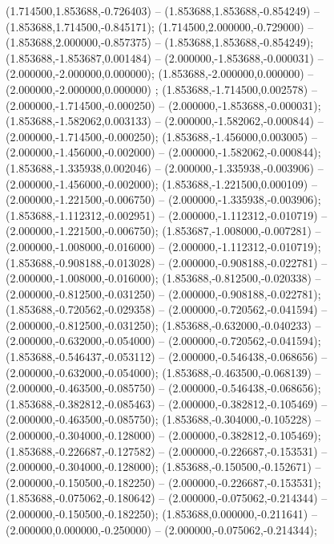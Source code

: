  (1.714500,1.853688,-0.726403) -- (1.853688,1.853688,-0.854249) -- (1.853688,1.714500,-0.845171);
 (1.714500,2.000000,-0.729000) -- (1.853688,2.000000,-0.857375) -- (1.853688,1.853688,-0.854249);
 (1.853688,-1.853687,0.001484) -- (2.000000,-1.853688,-0.000031) -- (2.000000,-2.000000,0.000000);
 (1.853688,-2.000000,0.000000) -- (2.000000,-2.000000,0.000000) ;
 (1.853688,-1.714500,0.002578) -- (2.000000,-1.714500,-0.000250) -- (2.000000,-1.853688,-0.000031);
 (1.853688,-1.582062,0.003133) -- (2.000000,-1.582062,-0.000844) -- (2.000000,-1.714500,-0.000250);
 (1.853688,-1.456000,0.003005) -- (2.000000,-1.456000,-0.002000) -- (2.000000,-1.582062,-0.000844);
 (1.853688,-1.335938,0.002046) -- (2.000000,-1.335938,-0.003906) -- (2.000000,-1.456000,-0.002000);
 (1.853688,-1.221500,0.000109) -- (2.000000,-1.221500,-0.006750) -- (2.000000,-1.335938,-0.003906);
 (1.853688,-1.112312,-0.002951) -- (2.000000,-1.112312,-0.010719) -- (2.000000,-1.221500,-0.006750);
 (1.853687,-1.008000,-0.007281) -- (2.000000,-1.008000,-0.016000) -- (2.000000,-1.112312,-0.010719);
 (1.853688,-0.908188,-0.013028) -- (2.000000,-0.908188,-0.022781) -- (2.000000,-1.008000,-0.016000);
 (1.853688,-0.812500,-0.020338) -- (2.000000,-0.812500,-0.031250) -- (2.000000,-0.908188,-0.022781);
 (1.853688,-0.720562,-0.029358) -- (2.000000,-0.720562,-0.041594) -- (2.000000,-0.812500,-0.031250);
 (1.853688,-0.632000,-0.040233) -- (2.000000,-0.632000,-0.054000) -- (2.000000,-0.720562,-0.041594);
 (1.853688,-0.546437,-0.053112) -- (2.000000,-0.546438,-0.068656) -- (2.000000,-0.632000,-0.054000);
 (1.853688,-0.463500,-0.068139) -- (2.000000,-0.463500,-0.085750) -- (2.000000,-0.546438,-0.068656);
 (1.853688,-0.382812,-0.085463) -- (2.000000,-0.382812,-0.105469) -- (2.000000,-0.463500,-0.085750);
 (1.853688,-0.304000,-0.105228) -- (2.000000,-0.304000,-0.128000) -- (2.000000,-0.382812,-0.105469);
 (1.853688,-0.226687,-0.127582) -- (2.000000,-0.226687,-0.153531) -- (2.000000,-0.304000,-0.128000);
 (1.853688,-0.150500,-0.152671) -- (2.000000,-0.150500,-0.182250) -- (2.000000,-0.226687,-0.153531);
 (1.853688,-0.075062,-0.180642) -- (2.000000,-0.075062,-0.214344) -- (2.000000,-0.150500,-0.182250);
 (1.853688,0.000000,-0.211641) -- (2.000000,0.000000,-0.250000) -- (2.000000,-0.075062,-0.214344);
